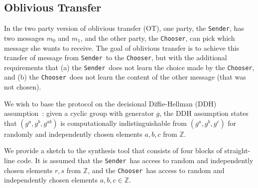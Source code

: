 \documentclass[preprint]{sig-alternate-05-2015}
\def\sender{{\tt{Sender}}}
\def\chooser{{\tt{Chooser}}}
\begin{document}
\subsection{Oblivious Transfer}

In the two party version of oblivious transfer (OT), 
one party, the \sender, has two messages $m_0$ and $m_1$,
and the other party, the \chooser, can pick which message she wants to receive.
The goal of oblivious transfer is to achieve this transfer of
message from \sender\ to the \chooser, but with the additional
requirements that
(a) the \sender\ does not learn the choice made by the \chooser,
and
(b) the \chooser\ does not learn the content of the other message 
(that was not chosen).

We wish to base the protocol on the decisional Diffie-Hellman (DDH) assumption~\cite{Boneh:DDH}:
given a cyclic group with generator $g$, the DDH assumption states that
$(g^a,g^b,g^{ab})$ is computationally indistinguishable from
$(g^a,g^b,g^c)$ for randomly and independently chosen elements $a,b,c$ from $\mathbb{Z}$.


We provide a sketch to the synthesis tool that consists of four blocks of straight-line code.
It is assumed that the \sender\ has access to random and independently chosen elements 
$r,s$ from $\mathbb{Z}$, and the \chooser\ has access to random and independently chosen
elements $a,b,c\in\mathbb{Z}$.
\end{document}
